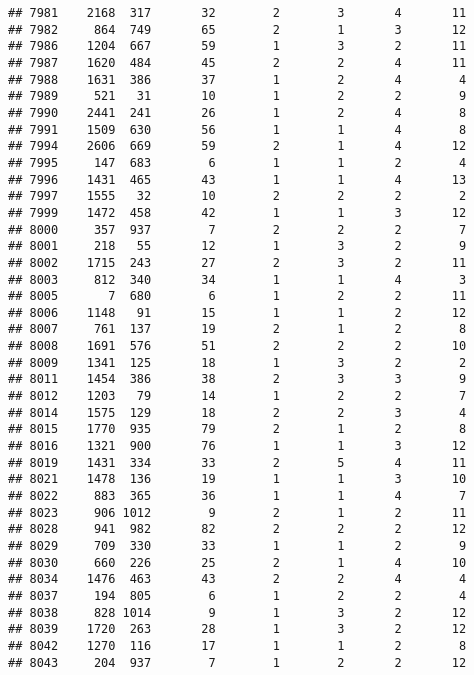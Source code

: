 \documentclass[]{article}
\begin{document}
\begin{verbatim}
## 7981    2168  317       32        2        3       4       11
## 7982     864  749       65        2        1       3       12
## 7986    1204  667       59        1        3       2       11
## 7987    1620  484       45        2        2       4       11
## 7988    1631  386       37        1        2       4        4
## 7989     521   31       10        1        2       2        9
## 7990    2441  241       26        1        2       4        8
## 7991    1509  630       56        1        1       4        8
## 7994    2606  669       59        2        1       4       12
## 7995     147  683        6        1        1       2        4
## 7996    1431  465       43        1        1       4       13
## 7997    1555   32       10        2        2       2        2
## 7999    1472  458       42        1        1       3       12
## 8000     357  937        7        2        2       2        7
## 8001     218   55       12        1        3       2        9
## 8002    1715  243       27        2        3       2       11
## 8003     812  340       34        1        1       4        3
## 8005       7  680        6        1        2       2       11
## 8006    1148   91       15        1        1       2       12
## 8007     761  137       19        2        1       2        8
## 8008    1691  576       51        2        2       2       10
## 8009    1341  125       18        1        3       2        2
## 8011    1454  386       38        2        3       3        9
## 8012    1203   79       14        1        2       2        7
## 8014    1575  129       18        2        2       3        4
## 8015    1770  935       79        2        1       2        8
## 8016    1321  900       76        1        1       3       12
## 8019    1431  334       33        2        5       4       11
## 8021    1478  136       19        1        1       3       10
## 8022     883  365       36        1        1       4        7
## 8023     906 1012        9        2        1       2       11
## 8028     941  982       82        2        2       2       12
## 8029     709  330       33        1        1       2        9
## 8030     660  226       25        2        1       4       10
## 8034    1476  463       43        2        2       4        4
## 8037     194  805        6        1        2       2        4
## 8038     828 1014        9        1        3       2       12
## 8039    1720  263       28        1        3       2       12
## 8042    1270  116       17        1        1       2        8
## 8043     204  937        7        1        2       2       12

\end{verbatim}
\end{document}
